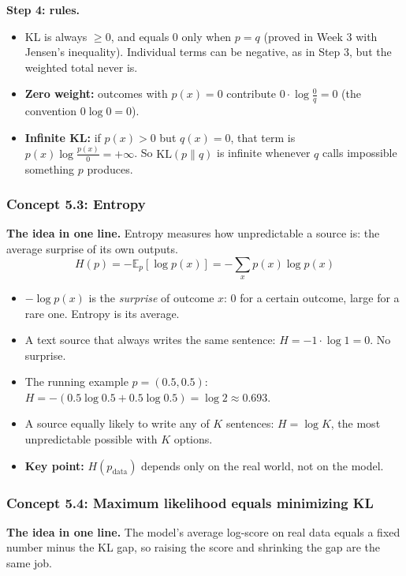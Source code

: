 \documentclass[12pt,a4paper]{article}
\begin{document}
\textbf{Step 4: rules.}
\begin{itemize}[nosep]
  \item KL is always $\ge0$, and equals 0 only when $p=q$ (proved in Week 3 with Jensen's inequality). Individual terms can be negative, as in Step 3, but the weighted total never is.
  \item \textbf{Zero weight:} outcomes with $p(x)=0$ contribute $0\cdot\log\frac0q=0$ (the convention $0\log0=0$).
  \item \textbf{Infinite KL:} if $p(x)>0$ but $q(x)=0$, that term is $p(x)\log\frac{p(x)}{0}=+\infty$. So $\mathrm{KL}(p\|q)$ is infinite whenever $q$ calls impossible something $p$ produces.
\end{itemize}

\subsubsection{Concept 5.3: Entropy}\label{c5-3}

\textbf{The idea in one line.} Entropy measures how unpredictable a source is: the average surprise of its own outputs.
\[
H(p)=-\mathbb{E}_p[\log p(x)]=-\sum_x p(x)\log p(x)
\]
\begin{itemize}[nosep]
  \item $-\log p(x)$ is the \emph{surprise} of outcome $x$: 0 for a certain outcome, large for a rare one. Entropy is its average.
  \item A text source that always writes the same sentence: $H=-1\cdot\log1=0$. No surprise.
  \item The running example $p=(0.5,0.5)$: $H=-(0.5\log0.5+0.5\log0.5)=\log2\approx0.693$.
  \item A source equally likely to write any of $K$ sentences: $H=\log K$, the most unpredictable possible with $K$ options.
  \item \textbf{Key point:} $H(p_{\text{data}})$ depends only on the real world, not on the model.
\end{itemize}

\subsubsection{Concept 5.4: Maximum likelihood equals minimizing KL}\label{c5-4}

\textbf{The idea in one line.} The model's average log-score on real data equals a fixed number minus the KL gap, so raising the score and shrinking the gap are the same job.
\end{document}
